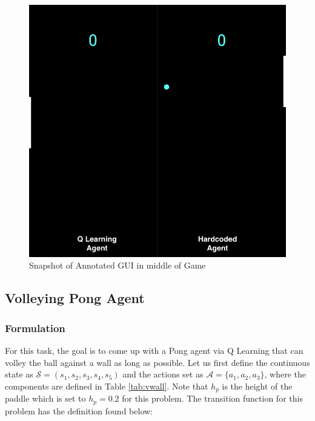 \documentclass{article}[12pt]
\begin{document}
   \begin{figure}[!htb]
   	\centering
   	\includegraphics[scale=0.7]{gui_snapshot2.png}
   	\caption{Snapshot of Annotated GUI in middle of Game}
   	\label{fig:gui1}
   \end{figure}
   
   \subsection{Volleying Pong Agent}
   \subsubsection{Formulation}
   For this task, the goal is to come up with a Pong agent via Q Learning that can volley the ball against a wall as long as possible. Let us first define the continuous state as $\mathcal{S} = \left( s_1, s_2, s_3, s_4, s_5\right)$ and the actions set as $\mathcal{A} = \lbrace a_1, a_2, a_3\rbrace $, where the components are defined in Table \ref{tab:vwall}. Note that $h_p$ is the height of the paddle which is set to $h_p = 0.2$ for this problem. The transition function for this problem has the definition found below:
   
\end{document}
